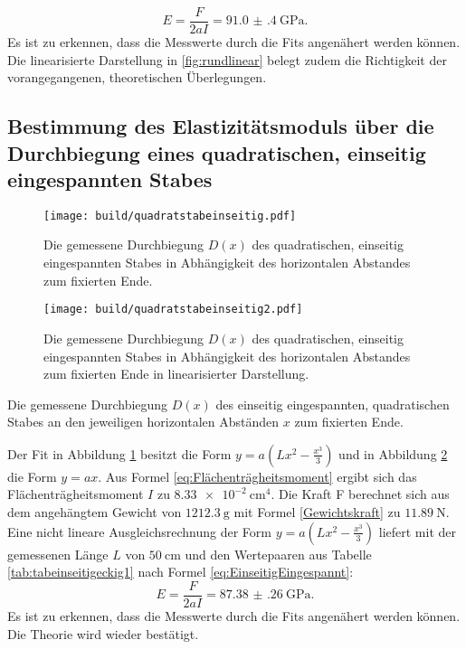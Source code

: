 \begin{displaymath}
	E = \frac{F}{2 a I}= \SI{91.0(4)}{\giga\pascal}\text{.}
\end{displaymath}
Es ist zu erkennen, dass die Messwerte durch die Fits angenähert werden können. Die linearisierte Darstellung in
 \ref{fig:rundlinear} belegt zudem die Richtigkeit der vorangegangenen, theoretischen Überlegungen. 



\subsection{Bestimmung des Elastizitätsmoduls über die Durchbiegung eines quadratischen, einseitig eingespannten Stabes}

\begin{figure}
	\centering
	\caption{Die gemessene Durchbiegung $D(x)$ des quadratischen, einseitig eingespannten Stabes
	 in Abhängigkeit des horizontalen Abstandes zum fixierten Ende.}
	\texttt{[image: build/quadratstabeinseitig.pdf]}
	\label{fig:quadratisch}
\end{figure}
\begin{figure}
	\centering
	\caption{Die gemessene Durchbiegung $D(x)$ des quadratischen, einseitig eingespannten Stabes
	 in Abhängigkeit des horizontalen Abstandes zum fixierten Ende in linearisierter Darstellung.}
	\texttt{[image: build/quadratstabeinseitig2.pdf]}
	\label{fig:quadratischlinear}
\end{figure}
\begin{table}
	\caption{Die gemessene Durchbiegung $D(x)$ des einseitig eingespannten, quadratischen Stabes an den jeweiligen horizontalen Abständen $x$ zum fixierten Ende.}
	\begin{minipage}{0.5\textwidth}
		\centering
		
	\end{minipage}
	\begin{minipage}{0.5\textwidth}
		\centering
		
	\end{minipage}
\end{table}
Der Fit in Abbildung \ref{fig:quadratisch} besitzt die Form $y = a ( L x^2 - \frac{x^3}{3} ) $ und in Abbildung \ref{fig:quadratischlinear} die Form $y=a x$. Aus Formel \eqref{eq:Flächenträgheitsmoment} ergibt sich das Flächenträgheitsmoment $I$ zu $\SI{8.33e-2}{\centi\meter\tothe{4}}$. Die Kraft F berechnet sich aus dem angehängtem Gewicht von $\SI{1212.3}{\gram}$ mit Formel \eqref{Gewichtskraft} zu $\SI{11.89}{\newton}$. Eine nicht lineare Ausgleichsrechnung der Form $y = a ( L x^2 - \frac{x^3}{3})$ liefert mit der gemessenen Länge $L$ von $\SI{50}{\centi\meter}$ und den Wertepaaren aus Tabelle \ref{tab:tabeinseitigeckig1} nach Formel \eqref{eq:EinseitigEingespannt}:
\begin{displaymath}
E = \frac{F}{2 a I}= \SI{87.38(26)}{\giga\pascal}\text{.}
\end{displaymath}
Es ist zu erkennen, dass die Messwerte durch die Fits angenähert werden können. Die Theorie wird wieder bestätigt.




